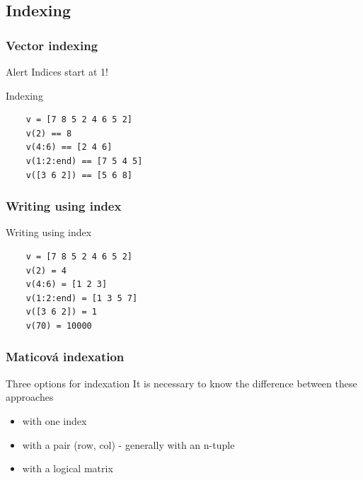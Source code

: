 \documentclass{beamer}
\begin{document}
\subsection{Indexing}

\begin{frame}[fragile]
\frametitle{Vector indexing}
  \begin{alertblock}{Alert}
    Indices start at 1!
  \end{alertblock}  
    
  \begin{block}{Indexing}
  \begin{verbatim}
    v = [7 8 5 2 4 6 5 2]
    v(2) == 8
    v(4:6) == [2 4 6]
    v(1:2:end) == [7 5 4 5]
    v([3 6 2]) == [5 6 8]\end{verbatim}
  \end{block}
  
\end{frame}

\begin{frame}[fragile]
\frametitle{Writing using index}

  \begin{block}{Writing using index}
  \begin{verbatim}
    v = [7 8 5 2 4 6 5 2]
    v(2) = 4
    v(4:6) = [1 2 3]
    v(1:2:end) = [1 3 5 7]
    v([3 6 2]) = 1
    v(70) = 10000\end{verbatim}
  \end{block}
  
  \pause
  
\end{frame}

\begin{frame}
\frametitle{Maticová indexation}
  \begin{alertblock}{Three options for indexation}
    It is necessary to know the difference between these approaches
    \begin{itemize}
      \item with one index
      \item with a pair (row, col) - generally with an n-tuple
      \item with a logical matrix
    \end{itemize}
  \end{alertblock}
\end{frame}
\end{document}
